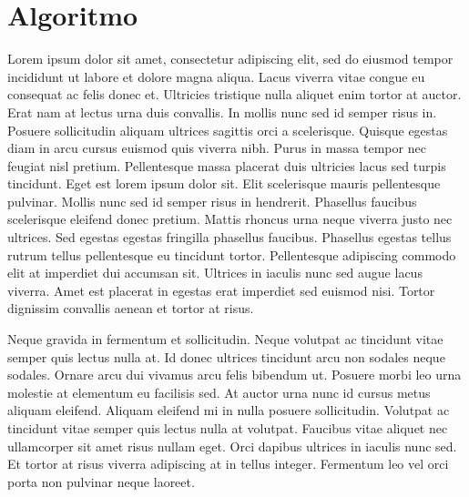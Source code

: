 \documentclass[a4]{report}
\begin{document}
\section{Algoritmo}
Lorem ipsum dolor sit amet, consectetur adipiscing elit, sed do eiusmod tempor incididunt ut labore et dolore magna aliqua. Lacus viverra vitae congue eu consequat ac felis donec et. Ultricies tristique nulla aliquet enim tortor at auctor. Erat nam at lectus urna duis convallis. In mollis nunc sed id semper risus in. Posuere sollicitudin aliquam ultrices sagittis orci a scelerisque. Quisque egestas diam in arcu cursus euismod quis viverra nibh. Purus in massa tempor nec feugiat nisl pretium. Pellentesque massa placerat duis ultricies lacus sed turpis tincidunt. Eget est lorem ipsum dolor sit. Elit scelerisque mauris pellentesque pulvinar. Mollis nunc sed id semper risus in hendrerit. Phasellus faucibus scelerisque eleifend donec pretium. Mattis rhoncus urna neque viverra justo nec ultrices. Sed egestas egestas fringilla phasellus faucibus. Phasellus egestas tellus rutrum tellus pellentesque eu tincidunt tortor. Pellentesque adipiscing commodo elit at imperdiet dui accumsan sit. Ultrices in iaculis nunc sed augue lacus viverra. Amet est placerat in egestas erat imperdiet sed euismod nisi. Tortor dignissim convallis aenean et tortor at risus.

Neque gravida in fermentum et sollicitudin. Neque volutpat ac tincidunt vitae semper quis lectus nulla at. Id donec ultrices tincidunt arcu non sodales neque sodales. Ornare arcu dui vivamus arcu felis bibendum ut. Posuere morbi leo urna molestie at elementum eu facilisis sed. At auctor urna nunc id cursus metus aliquam eleifend. Aliquam eleifend mi in nulla posuere sollicitudin. Volutpat ac tincidunt vitae semper quis lectus nulla at volutpat. Faucibus vitae aliquet nec ullamcorper sit amet risus nullam eget. Orci dapibus ultrices in iaculis nunc sed. Et tortor at risus viverra adipiscing at in tellus integer. Fermentum leo vel orci porta non pulvinar neque laoreet.
\end{document}
